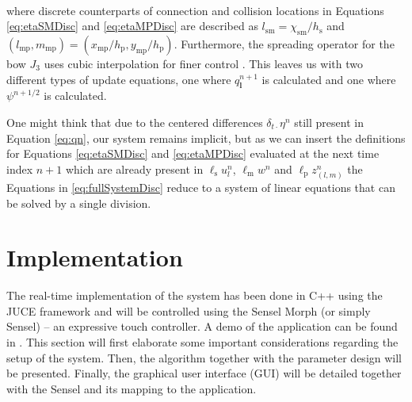 \documentclass[dvipsnames, pdftex]{article}
\def\SWcomment[#1]{\textcolor{Bittersweet}{#1}}
\def\stringx{\chi}
\def\ugen{q}
\def\us{u}
\def\um{w}
\def\up{z}
\begin{document}
\\
where discrete counterparts of connection and collision locations in Equations \eqref{eq:etaSMDisc} and \eqref{eq:etaMPDisc} are described as $l_\text{sm} = \stringx_\text{sm}/h_\text{s}$ and $(l_\text{mp}, m_\text{mp}) = (x_\text{mp}/h_\text{p}, y_\text{mp}/h_\text{p})$. Furthermore, the spreading operator for the bow $J_3$ uses cubic interpolation for finer control \cite{bilbao2009numerical}. This leaves us with two different types of update equations, one where $\ugen^{n+1}_{\boldsymbol{l}}$ is calculated and one where $\psi^{n+1/2}$ is calculated.

One might think that due to the centered differences $\delta_{t\cdot}\eta^n$ still present in Equation \eqref{eq:qn}, our system remains implicit, but as we can insert the definitions for Equations \eqref{eq:etaSMDisc} and \eqref{eq:etaMPDisc} evaluated at the next time index $n+1$ which are already present in $\ell_\text{s}\us_l^n$, $\ell_\text{m}\um^n$ and $\ell_\text{p}\up_{(l,m)}^n$ the Equations in \eqref{eq:fullSystemDisc} reduce to a system of linear equations that can be solved by a single division. %

\section{Implementation}\label{sec:implementation}
The real-time implementation of the system has been done in C++ using the JUCE framework \cite{JUCE2020} and will be controlled using the Sensel Morph (or simply Sensel) -- an expressive touch controller. A demo of the application can be found in \cite{youtubeDemo:SMC2020}. This section will first elaborate some important considerations regarding the setup of the system. Then, the algorithm together with the parameter design will be presented.  Finally, the graphical user interface (GUI) will be detailed together with the Sensel and its mapping to the application.
\end{document}
